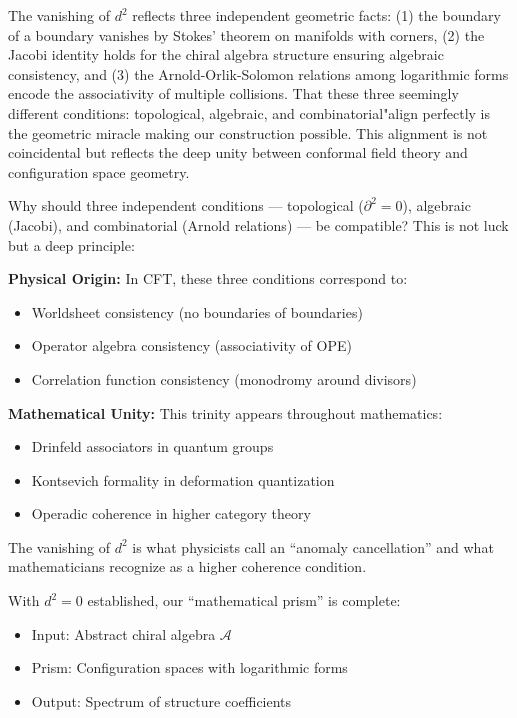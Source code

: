 \begin{remark}
   The vanishing of $d^2$ reflects three independent geometric facts: (1) the boundary of a boundary vanishes by Stokes' theorem on manifolds with corners, (2) the Jacobi identity holds for the chiral algebra structure ensuring algebraic consistency, and (3) the Arnold-Orlik-Solomon relations among logarithmic forms encode the associativity of multiple collisions. That these three seemingly different conditions: topological, algebraic, and combinatorial"align perfectly is the geometric miracle making our construction possible. This alignment is not coincidental but reflects the deep unity between conformal field theory and configuration space geometry.

      Why should three independent conditions --- topological ($\partial^2 = 0$), algebraic (Jacobi), and 
      combinatorial (Arnold relations) --- be compatible? This is not luck but a deep principle:
      
      \textbf{Physical Origin:} In CFT, these three conditions correspond to:
      \begin{itemize}
      \item Worldsheet consistency (no boundaries of boundaries)
      \item Operator algebra consistency (associativity of OPE)
      \item Correlation function consistency (monodromy around divisors)
      \end{itemize}
      
      \textbf{Mathematical Unity:} This trinity appears throughout mathematics:
      \begin{itemize}
      \item Drinfeld associators in quantum groups
      \item Kontsevich formality in deformation quantization  
      \item Operadic coherence in higher category theory
      \end{itemize}
      
      The vanishing of $d^2$ is what physicists call an ``anomaly cancellation'' and what mathematicians 
      recognize as a higher coherence condition.
      \end{remark}
      
      \begin{remark}
      With $d^2 = 0$ established, our ``mathematical prism'' is complete:
      \begin{itemize}
      \item Input: Abstract chiral algebra $\mathcal{A}$
      \item Prism: Configuration spaces with logarithmic forms
      \item Output: Spectrum of structure coefficients
      \end{itemize}
      

\end{remark}

